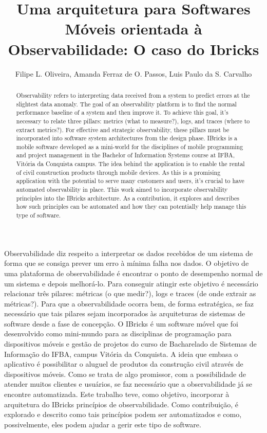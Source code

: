 \documentclass[12pt]{article}
\title{Uma arquitetura para Softwares Móveis orientada à Observabilidade: O caso do Ibricks}
\author{Filipe L. Oliveira, Amanda Ferraz de O. Passos,  Luis Paulo da S. Carvalho}%
\begin{document}
 

\maketitle

\begin{abstract}
Observability refers to interpreting data received from a system to predict errors at the slightest data anomaly. The goal of an observability platform is to find the normal performance baseline of a system and then improve it. To achieve this goal, it's necessary to relate three pillars: metrics (what to measure?), logs, and traces (where to extract metrics?). For effective and strategic observability, these pillars must be incorporated into software system architectures from the design phase. IBricks is a mobile software developed as a mini-world for the disciplines of mobile programming and project management in the Bachelor of Information Systems course at IFBA, Vitória da Conquista campus. The idea behind the application is to enable the rental of civil construction products through mobile devices. As this is a promising application with the potential to serve many customers and users, it's crucial to have automated observability in place. This work aimed to incorporate observability principles into the IBricks architecture. As a contribution, it explores and describes how such principles can be automated and how they can potentially help manage this type of software.
\end{abstract}
     
\begin{resumo} 
Observabilidade diz respeito a interpretar os dados recebidos de um sistema de forma que se consiga prever um erro à mínima falha nos dados. O objetivo de uma plataforma de observabilidade é encontrar o ponto de desempenho normal de um sistema e depois melhorá-lo. Para conseguir atingir este objetivo é necessário relacionar três pilares: métricas (o que medir?), logs e traces (de onde extrair as métricas?). Para que a observabilidade ocorra bem, de forma estratégica, se faz necessário que tais pilares sejam incorporados às arquiteturas de sistemas de software desde a fase de concepção. 
O IBricks é um software móvel que foi desenvolvido como mini-mundo para as disciplinas de programação para dispositivos móveis e gestão de projetos do curso de Bacharelado de Sistemas de Informação do IFBA, campus Vitória da Conquista. A ideia que embasa o aplicativo é possibilitar o aluguel de produtos da construção civil através de dispositivos móveis. Como se trata de algo promissor, com a possibilidade de atender muitos clientes e usuários, se faz necessário que a observabilidade já se encontre automatizada.
Este trabalho teve, como objetivo, incorporar à arquitetura do IBricks princípios de observabilidade. Como contribuição, é explorado e descrito como tais princípios podem ser automatizados e como, possivelmente, eles podem ajudar a gerir este tipo de software.
\end{resumo}
\end{document}
